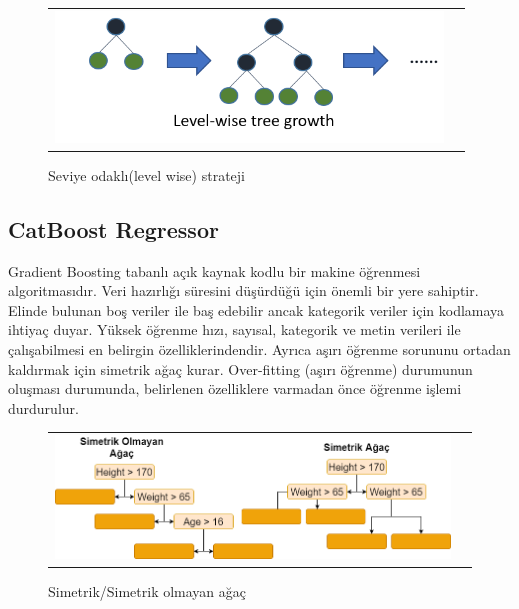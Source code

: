\documentclass[conference]{IEEEtran}
\begin{document}
\begin{figure}[!h]
	\centering
	\begin{center}
		\begin{tabular}{cc}
			\includegraphics[scale=0.5]{pictures/pic_06.png}&
		\end{tabular}
	\end{center}
	\caption{Seviye odaklı(level wise) strateji\cite{13}}
	\label{fig:06}
\end{figure}
\pagebreak

\subsection{\textbf{CatBoost Regressor}}
\quad Gradient Boosting tabanlı açık kaynak kodlu bir makine öğrenmesi algoritmasıdır. Veri hazırlığı süresini düşürdüğü için önemli bir yere sahiptir. Elinde bulunan boş veriler ile baş edebilir ancak kategorik veriler için kodlamaya ihtiyaç duyar. Yüksek öğrenme hızı, sayısal, kategorik ve metin verileri ile çalışabilmesi en belirgin özelliklerindendir. Ayrıca aşırı öğrenme sorununu ortadan kaldırmak için simetrik ağaç kurar. Over-fitting (aşırı öğrenme) durumunun oluşması durumunda, belirlenen özelliklere varmadan önce öğrenme işlemi durdurulur\cite{14}.

\begin{figure}[!h]
	\centering
	\begin{center}
		\begin{tabular}{cc}
			\includegraphics[scale=0.325]{pictures/pic_07.png}&
		\end{tabular}
	\end{center}
	\caption{Simetrik/Simetrik olmayan ağaç}
	\label{fig:07}
\end{figure}
\end{document}
